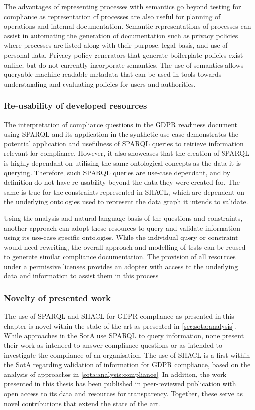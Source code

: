 The advantages of representing processes with semantics go beyond testing for compliance as representation of processes are also useful for planning of operations and internal documentation. Semantic representations of processes can assist in automating the generation of documentation such as privacy policies where processes are listed along with their purpose, legal basis, and use of personal data. Privacy policy generators that generate boilerplate policies exist online, but do not currently incorporate semantics. The use of semantics allows queryable machine-readable metadata that can be used in tools towards understanding and evaluating policies for users and authorities.

\subsubsection*{Re-usability of developed resources}
The interpretation of compliance questions in the GDPR readiness document using SPARQL and its application in the synthetic use-case demonstrates the potential application and usefulness of SPARQL queries to retrieve information relevant for compliance.
However, it also showcases that the creation of SPARQL is highly dependant on utilising the same ontological concepts as the data it is querying. Therefore, such SPARQL queries are use-case dependant, and by definition do not have re-usability beyond the data they were created for.
The same is true for the constraints represented in SHACL, which are dependent on the underlying ontologies used to represent the data graph it intends to validate.

Using the analysis and natural language basis of the questions and constraints, another approach can adopt these resources to query and validate information using its use-case specific ontologies.
While the individual query or constraint would need rewriting, the overall approach and modelling of tests can be reused to generate similar compliance documentation.
The provision of all resources under a permissive licenses provides an adopter with access to the underlying data and information to assist them in this process.

\subsubsection*{Novelty of presented work}
The use of SPARQL and SHACL for GDPR compliance as presented in this chapter is novel within the state of the art as presented in \autoref{sec:sota:analysis}.
While approaches in the SotA use SPARQL to query information, none present their work as intended to answer compliance questions or as intended to investigate the compliance of an organisation.
The use of SHACL is a first within the SotA regarding validation of information for GDPR compliance, based on the analysis of approaches in \autoref{sota:analysis:compliance}.
In addition, the work presented in this thesis has been published in peer-reviewed publication with open access to its data and resources for transparency.
Together, these serve as novel contributions that extend the state of the art.
